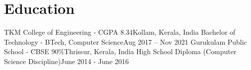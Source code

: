 \section{Education}
  \resumeSubHeadingListStart
    \resumeSubheading
      {TKM College of Engineering - CGPA 8.34}{Kollam, Kerala, India}
      {Bachelor of Technology - BTech, Computer Science}{Aug 2017 -- Nov 2021}
    \resumeSubheading
      {Gurukulam Public School - CBSE 90\%}{Thrissur, Kerala, India}
      {High School Diploma (Computer Science Discipline)}{June 2014 - June 2016}
  \resumeSubHeadingListEnd

